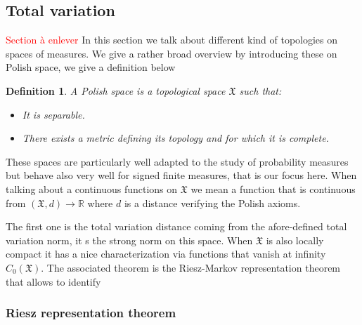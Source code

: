 \documentclass[11pt,a4paper]{article}
\newcommand{\RR}{\mathbb{R}}
\newcommand{\XF}{\mathfrak{X}}
\newcommand{\red}[1]{\textcolor{red}{#1}}
\newtheorem{definition}[theorem]{Definition}
\begin{document}
\subsection{Total variation}
\red{Section à enlever}
In this section we talk about different kind of topologies on spaces of measures. We give a rather broad overview by introducing these on Polish space, we give a definition below
\begin{definition}
    A Polish space is a topological space $\XF$ such that:
    \begin{itemize}
        \item It is separable.
        \item There exists a metric defining its topology and for which it is complete.
    \end{itemize}
\end{definition}
These spaces are particularly well adapted to the study of probability measures but behave also very well for signed finite measures, that is our focus here. When talking about a continuous functions on $\XF$ we mean a function that is continuous from $(\XF,d) \to \RR$ where $d$ is a distance verifying the Polish axioms.

The first one is the total variation distance coming from the afore-defined total variation norm, it s the strong norm on this space. When $\XF$ is also locally compact it has a nice characterization via functions that vanish at infinity $C_0(\XF)$. The associated theorem is the Riesz-Markov representation theorem that allows to identify
\subsubsection{Riesz representation theorem}
\end{document}
